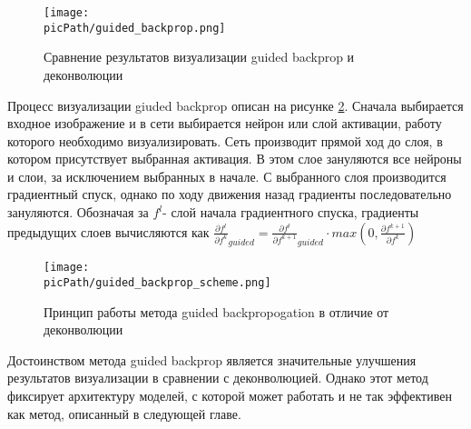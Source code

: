 \documentclass[oneside,final,14pt]{extreport}
\newcommand{\picPath}{img}
\begin{document}
\begin{figure}[H]
\begin{center}
\texttt{[image: \\picPath/guided\_backprop.png]}
\end{center}
  \caption{Сравнение результатов визуализации guided backprop и деконволюции}
  \label{pic:g_backprop}
\end{figure}
Процесс визуализации giuded backprop описан на рисунке 
\ref{pic:g_backprop_scheme}. Сначала выбирается входное изображение и в сети выбирается нейрон или слой активации, работу которого необходимо визуализировать. Сеть производит прямой ход до слоя, в котором присутствует выбранная активация.  В этом слое зануляются все нейроны и слои, за исключением выбранных в начале. С выбранного слоя производится градиентный спуск, однако по ходу движения назад градиенты последовательно зануляются. Обозначая за $f^l$- слой начала градиентного спуска, градиенты предыдущих слоев вычисляются как $\frac{\partial f^{l}}{\partial f^{k}}_{guided}=\frac{\partial f^{l}}{\partial f^{k+1}}_{guided} \cdot max(0,\frac{\partial f^{k+1}}{\partial f^k})$ 
\begin{figure}[H]
\begin{center}
\texttt{[image: \\picPath/guided\_backprop\_scheme.png]}
\end{center}
  \caption{Принцип работы метода guided backpropogation в отличие от деконволюции}
  \label{pic:g_backprop_scheme}
\end{figure}

Достоинством метода guided backprop является значительные улучшения результатов визуализации в сравнении с деконволюцией. Однако этот метод фиксирует архитектуру моделей, с которой может работать и не так эффективен как метод, описанный в следующей главе. 
\end{document}
